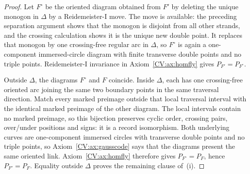 \begin{proof}
Let $F^{\circ}$ be the oriented diagram obtained from $F'$ by deleting the
unique monogon in $\Delta$ by a Reidemeister-I move.  The move is available:
the preceding separation argument shows that the monogon is disjoint from
all other strands, and the crossing calculation shows it is the unique new
double point.  It replaces that monogon by one crossing-free regular arc in
$\Delta$, so $F^{\circ}$ is again a one-component immersed-circle diagram with
finite transverse double points and no triple points.  Reidemeister-I
invariance in Axiom~\ref{CV:ax:homfly} gives $P_{F'}=P_{F^{\circ}}$.

Outside $\Delta$, the diagrams $F^{\circ}$ and $F$ coincide.  Inside
$\Delta$, each has one crossing-free oriented arc joining the same two
boundary points in the same traversal direction.  Match every marked
preimage outside that local traversal interval with the identical marked
preimage of the other diagram.  The local intervals contain no marked
preimage, so this bijection preserves cyclic order, crossing pairs,
over/under positions and signs: it is a record isomorphism.  Both underlying
curves are one-component immersed circles with transverse double points and
no triple points, so Axiom~\ref{CV:ax:gausscode} says that the diagrams present
the same oriented link.  Axiom~\ref{CV:ax:homfly} therefore gives
$P_{F^{\circ}}=P_F$, hence $P_{F'}=P_F$.  Equality outside $\Delta$ proves the
remaining clause of~(i).
\end{proof}

